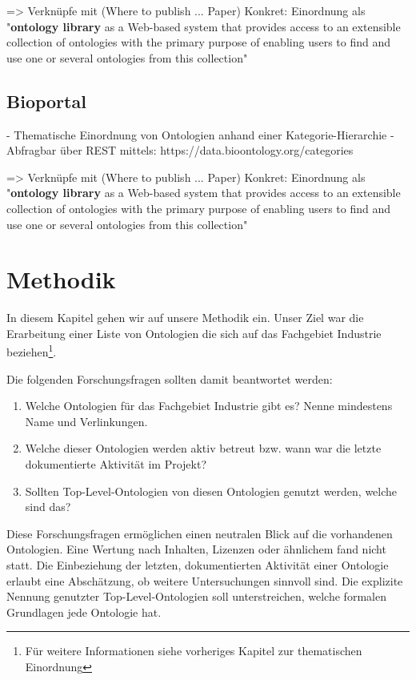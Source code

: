 \documentclass{article}
\begin{document}
=> Verknüpfe mit (Where to publish ... Paper) \cite{d2012publish}
Konkret: Einordnung als "\textbf{ontology library} as a Web-based system that provides access to an
extensible collection of ontologies with the primary purpose of enabling users to find and
use one or several ontologies from this collection"



\subsection{Bioportal}

- Thematische Einordnung von Ontologien anhand einer Kategorie-Hierarchie
  - Abfragbar über REST mittels: https://data.bioontology.org/categories

=> Verknüpfe mit (Where to publish ... Paper) \cite{d2012publish}
Konkret: Einordnung als "\textbf{ontology library} as a Web-based system that provides access to an
extensible collection of ontologies with the primary purpose of enabling users to find and
use one or several ontologies from this collection"


\section{Methodik}

In diesem Kapitel gehen wir auf unsere Methodik ein.
Unser Ziel war die Erarbeitung einer Liste von Ontologien die sich auf das Fachgebiet Industrie beziehen\footnote{Für weitere Informationen siehe vorheriges Kapitel zur thematischen Einordnung}.

Die folgenden Forschungsfragen sollten damit beantwortet werden:

\begin{enumerate}
    \item Welche Ontologien für das Fachgebiet Industrie gibt es? Nenne mindestens Name und Verlinkungen.
    \item Welche dieser Ontologien werden aktiv betreut bzw. wann war die letzte dokumentierte Aktivität im Projekt?
    \item Sollten Top-Level-Ontologien von diesen Ontologien genutzt werden, welche sind das?
\end{enumerate}

Diese Forschungsfragen ermöglichen einen neutralen Blick auf die vorhandenen Ontologien.
Eine Wertung nach Inhalten, Lizenzen oder ähnlichem fand nicht statt.
Die Einbeziehung der letzten, dokumentierten Aktivität einer Ontologie erlaubt eine Abschätzung, ob weitere Untersuchungen sinnvoll sind.
Die explizite Nennung genutzter Top-Level-Ontologien soll unterstreichen, welche formalen Grundlagen jede Ontologie hat.
\end{document}
